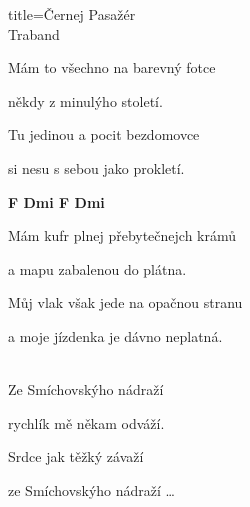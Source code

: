 \begin{song}{title=\centering Černej Pasažér \\\normalsize Traband \vspace*{-0.3cm}}
{\begin{minipage}[t]{0.48\textwidth}
\sloka
Mám to všechno na barevný fotce  

někdy z minulýho století. 

Tu jedinou a pocit bezdomovce 

si nesu s sebou jako prokletí.

\mezera
\textbf{F  Dmi F  Dmi }


\sloka
Mám kufr plnej přebytečnejch krámů 

a mapu zabalenou do plátna. 

Můj vlak však jede na opačnou stranu 

a moje jízdenka je dávno neplatná.

\\

Ze Smíchovskýho nádraží

rychlík mě někam odváží.

Srdce jak těžký závaží

ze Smíchovskýho nádraží \dots

\end{minipage}   %
}
\end{song}
\setcounter{Slokočet}{0}
